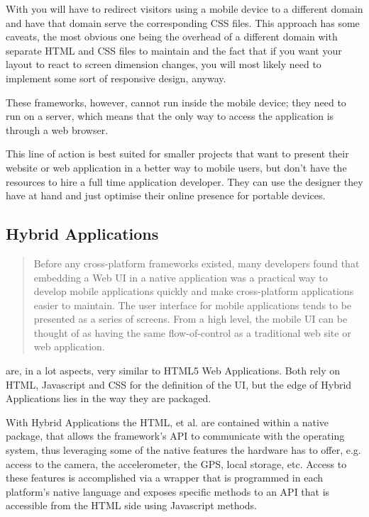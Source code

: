 With  you will have to redirect visitors using a mobile device to a different domain and have that domain serve the corresponding CSS files. This approach has some caveats, the most obvious one being the overhead of a different domain with separate HTML and CSS files to maintain and the fact that if you want your layout to react to screen dimension changes, you will most likely need to implement some sort of responsive design, anyway.   
 

These frameworks, however, cannot run inside the mobile device; they need to run on a server, which means that the only way to access the application is through a web browser.


This line of action is best suited for smaller projects that want to present their website or web application in a better way to mobile users, but don't have the resources to hire a full time application developer. They can use the designer they have at hand and just optimise their online presence for portable devices.

\subsection{Hybrid Applications}\label{sec:hyb_app}
\begin{quotation}
Before any cross-platform frameworks existed, many developers found that embedding a Web \ac{UI} in a native application was a practical way to develop mobile applications quickly and make cross-platform applications easier to maintain. The user interface for mobile applications tends to be presented as a series of screens. From a high level, the mobile \ac{UI} can be thought of as having the same flow-of-control as a traditional web site or web application. \cite[p. 28]{allen:2010}
\end{quotation}

 are, in a lot aspects, very similar to HTML5 Web Applications. Both rely on HTML, Javascript and CSS for the definition of the \ac{UI}, but the edge of Hybrid Applications lies in the way they are packaged.

With Hybrid Applications the HTML, et al. are contained within a native package, that allows the framework's \ac{API} to communicate with the operating system, thus leveraging some of the native features the hardware has to offer, e.g. access to the camera, the accelerometer, the GPS, local storage, etc. Access to these features is accomplished via a wrapper that is programmed in each platform's native language and exposes specific methods to an \ac{API} that is accessible from the HTML side using Javascript methods.

